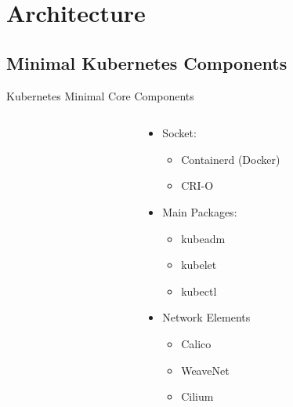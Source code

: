 \section{Architecture} \label{sec:architecture}
\subsection{Minimal Kubernetes Components}

\begin{frame}{Kubernetes Minimal Core Components}
	\begin{columns}[T] %
		\begin{column}{5cm} %
		\end{column}
		\begin{column}{5cm} %
			\begin{itemize}
				\item<+-| alert@+> Socket:
				\begin{itemize}
						\item<+-| alert@+> Containerd (Docker)
						\item<+-| alert@+> CRI-O
					\end{itemize}
				\item<+-| alert@+> Main Packages:
				\begin{itemize}
					\item<+-| alert@+> kubeadm
					\item<+-| alert@+> kubelet
					\item<+-| alert@+> kubectl
				\end{itemize}
				\item<+-| alert@+> Network Elements
					\begin{itemize}
						\item<+-| alert@+> Calico
						\item<+-| alert@+> WeaveNet
						\item<+-| alert@+> Cilium
					\end{itemize}
			\end{itemize}
		\end{column}
	\end{columns}
\end{frame}

